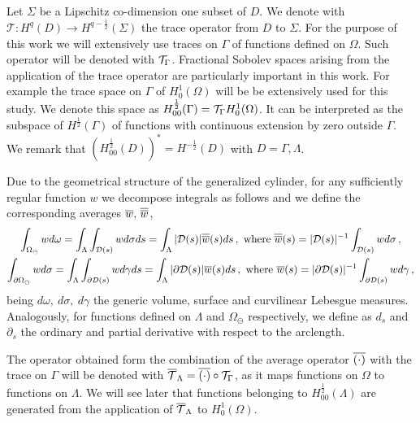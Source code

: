 \documentclass[r]{siamart171218}
\begin{document}
Let $\Sigma$ be a Lipschitz co-dimension one subset of $D$. 
We denote with $\mathcal{T}: H^q(D) \rightarrow H^{q-\frac12}(\Sigma)$ the trace operator from $D$ to $\Sigma$.
For the purpose of this work we will extensively use traces on $\Gamma$ of functions defined on $\Omega$. Such operator will be denoted with ${\mathcal{T}_\Gamma}$. 
Fractional Sobolev spaces arising from the application of the trace operator are particularly important in this work.
For example the trace space on $\Gamma$ of $H^1_0(\Omega)$ will be be extensively used for this study.
We denote this space as $H^{\frac12}_{00}(\Gamma) = {\mathcal{T}_\Gamma} H^1_0(\Omega)$.
It can be interpreted as the subspace of $H^{\frac12}(\Gamma)$ of functions with continuous extension by zero outside $\Gamma$.
We remark that $(H^{\frac12}_{00}(D))^* = H^{-\frac12}(D)$ with $D=\Gamma,\Lambda$.



Due to the  geometrical structure of the generalized cylinder, 
for any sufficiently regular function $w$ we decompose integrals as follows
and we define the corresponding averages $\overline{w},\,\overline{\overline{w}}$,
\begin{gather*}
\int_{\Omega_{\ominus}} w d\omega 
= \int_\Lambda \int_{\mathcal{D}(s)} w d\sigma ds
= \int_\Lambda |\mathcal{D}(s)|\overline{\overline{w}}(s) ds\,,
\ \textrm{where} \ \overline{\overline{w}}(s) = |\mathcal{D}(s)|^{-1} \int_{\mathcal{D}(s)} w d\sigma\,,
\\
\int_{\partial\Omega_{\ominus}} w d\sigma 
= \int_\Lambda \int_{\partial\mathcal{D}(s)} w d\gamma ds
= \int_\Lambda  |\partial \mathcal{D}(s)| \overline{w}(s) ds\,,
\ \textrm{where} \ \overline{w}(s) = |\partial\mathcal{D}(s)|^{-1} \int_{\partial\mathcal{D}(s)} w d\gamma\,,
\end{gather*}
being $d\omega, \ d\sigma, \ d\gamma$ the generic volume, surface and curvilinear Lebesgue measures.
Analogously, for functions defined on $\Lambda$ and $\Omega_\ominus$ respectively, 
we define as $d_s$ and $\partial_s$ the ordinary and partial derivative with respect to the arclength.



The operator obtained form the combination of the average operator $\overline{(\cdot)}$ with the trace on $\Gamma$ will be denoted with ${\overline{\mathcal{T}}_\Lambda} = \overline{(\cdot)} \circ {\mathcal{T}_\Gamma}$,
as it maps functions on $\Omega$ to functions on $\Lambda$.
We will see later that functions belonging to $H^{\frac12}_{00}(\Lambda)$ are generated from the application of ${\overline{\mathcal{T}}_\Lambda}$ to $H^1_0(\Omega)$.
\end{document}

